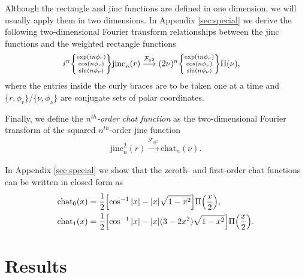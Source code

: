 \documentclass[]{osa-article}
\let\originalleft\left
\let\originalright\right
\renewcommand{\left}{\mathopen{}\mathclose\bgroup\originalleft}
\renewcommand{\right}{\aftergroup\egroup\originalright}
\providecommand{\mbb}[1]{\mathbb{#1}}
\begin{document}
Although the rectangle and jinc functions are defined in one dimension, we will
usually apply them in two dimensions. In Appendix \ref{sec:special} we derive
the following two-dimensional Fourier transform relationships between the jinc
functions and the weighted rectangle functions
\begin{align}
  i^{n}\left\{\substack{
  \text{exp}(in\phi_r)\\
    \cos(n\phi_r)\\
    \sin(n\phi_r)
  }\right\}\text{jinc}_n(r) &\stackrel{\mathcal{F}_{\mbb{R}^2}}{\longrightarrow} (2\nu)^{n}\left\{\substack{
    \text{exp}(in\phi_{\nu})\\
    \cos(n\phi_{\nu})\\
    \sin(n\phi_{\nu})
  }\right\}\Pi(\nu), \label{eq:jincrect2}
  \end{align}
  where the entries inside the curly braces are to be taken one at a time and
  $\{r, \phi_r\}/\{\nu, \phi_\nu\}$ are conjugate sets of polar coordinates.
  
Finally, we define the \textit{$n^{th}$-order chat function} as the
two-dimensional Fourier transform of the squared $n^{th}$-order jinc function
\begin{align}
  \text{jinc}_n^2(r) \stackrel{\mathcal{F}_{\mbb{R}^2}}{\longrightarrow} \text{chat}_n(\nu).
\end{align}

In Appendix \ref{sec:special} we show that the zeroth- and first-order chat
functions can be written in closed form as
\begin{align}
  \text{chat}_0(x) &=  \frac{1}{2}\left[\cos^{-1}|x| - |x|\sqrt{1 - x^2}\right]\Pi\left(\frac{x}{2}\right),\\
  \text{chat}_1(x) &=  \frac{1}{2}\left[\cos^{-1}|x| - |x|(3-2x^2)\sqrt{1 - x^2}\right]\Pi\left(\frac{x}{2}\right).  
\end{align}


\section{Results}\label{sec:results}
\end{document}
